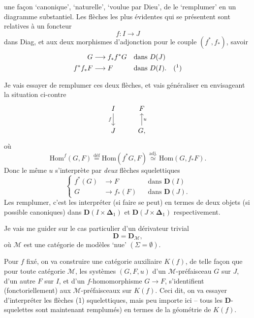 \documentclass[11pt]{article}
\newcommand{\printedpage}[1]{\marginpar{\footnotesize p.~#1}}
\newcommand{\msp}[1]{\marginpar{\footnotesize [#1]}}
\newcommand{\Hom}{\mathrm{Hom}}
\newcommand{\bDelta}{\boldsymbol{\Delta}}
\begin{document}
\printedpage{4}
\msp{page 78}
une façon ‘canonique’, ‘naturelle’, ‘voulue par Dieu’, de le ‘remplumer’ en un diagramme substantiel. Les flèches les plus évidentes qui se présentent sont relatives à un foncteur
\[ f : I \longrightarrow J \]
dans Diag, et aux deux morphismes d'adjonction pour le couple $(f^*, f_*)$, savoir
\[
\begin{aligned}
G &\longrightarrow f_*f^*G && \text{dans } D(J)\\
f^*f_*F &\longrightarrow F && \text{dans } D(I). \quad (\text{\footnotemark})
\end{aligned}
\]

Je vais essayer de remplumer ces deux flèches, et vais généraliser en envisageant la situation ci-contre
\[
\begin{tikzcd}
I \arrow[d, "f"'] & F \\
J & G, \arrow[u, "u"']
\end{tikzcd}
\]
où
\[ \Hom^f(G,F) \overset{\text{déf}}{=} \Hom(f^*G,F) \overset{\text{adj.}}{\simeq} \Hom(G,f_*F). \]
Donc le même $u$ s'interprète par \textit{deux} flèches squelettiques
\[
\left\{
\begin{aligned}
f^*(G) &\longrightarrow F && \text{dans } \mathbf{D}(I)\\
G &\longrightarrow f_*(F) && \text{dans } \mathbf{D}(J).
\end{aligned}
\right.
\tag*{(1)}
\]
Les remplumer, c'est les interpréter (si faire se peut) en termes de deux objets (si possible canoniques) dans $\mathbf{D}(I \times \bDelta_1)$ et $\mathbf{D}(J \times \bDelta_1)$ respectivement.

Je vais me guider sur le cas particulier d'un dérivateur trivial
\[ \mathbf{D} = \mathbf{D}_{\mathcal{M}}, \]
où $\mathcal{M}$ est une catégorie de modèles ‘nue’ $(\Sigma = \emptyset)$.

\msp{page 79}
Pour $f$ fixé, on va construire une catégorie auxiliaire $K(f)$, de telle façon que pour toute catégorie $\mathcal{M}$, les systèmes $(G,F,u)$ d'un $\mathcal{M}$-préfaisceau $G$ sur $J$, d'un autre $F$ sur $I$, et d'un $f$-homomorphisme $G \longrightarrow F$, s'identifient (fonctoriellement) aux $\mathcal{M}$-préfaisceaux sur
\printedpage{5}
$K(f)$. Ceci dit, on va essayer d'interpréter les flèches (1) squelettiques, mais peu importe ici -- tous les $\mathbf{D}$-squelettes sont maintenant remplumés) en termes de la géométrie de $K(f)$. %
\end{document}

